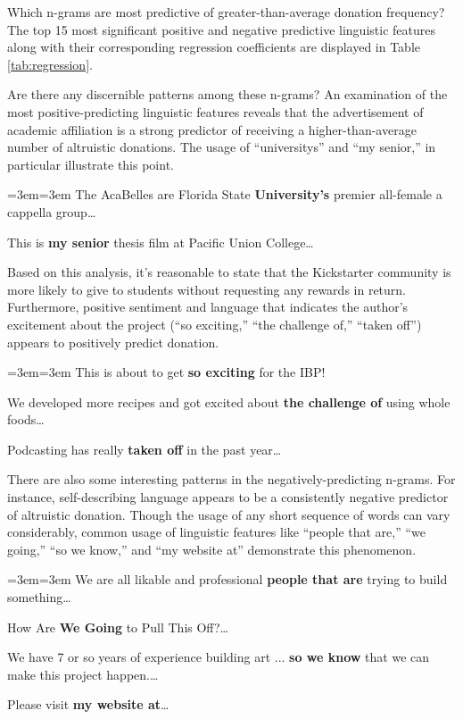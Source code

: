 \documentclass[letterpaper]{article}
\newenvironment{blockquote}{%
  \setlength{\parskip}{.5em}
  \par%
  \small
  \medskip
  \leftskip=3em\rightskip=3em%
  \noindent\ignorespaces}{%
  \par\medskip}
\begin{document}
Which n-grams are most predictive of greater-than-average donation frequency? The top 15 most significant positive and negative predictive linguistic features along with their corresponding regression coefficients are displayed in Table \ref{tab:regression}.

Are there any discernible patterns among these n-grams? An examination of the most positive-predicting linguistic features reveals that the advertisement of academic affiliation is a strong predictor of receiving a higher-than-average number of altruistic donations. The usage of ``universitys'' and ``my senior,'' in particular illustrate this point.
\begin{blockquote}
The AcaBelles are Florida State \textbf{University's} premier all-female a cappella group\ldots\par\noindent
This is \textbf{my senior} thesis film at Pacific Union College\ldots\par\noindent
\end{blockquote}
Based on this analysis, it's reasonable to state that the Kickstarter community is more likely to give to students without requesting any rewards in return.
Furthermore, positive sentiment and language that indicates the author's excitement about the project (``so exciting,'' ``the challenge of,'' ``taken off'') appears to positively predict donation.
\begin{blockquote}
This is about to get \textbf{so exciting} for the IBP! \par\noindent
We developed more recipes and got excited about \textbf{the challenge of} using whole foods\ldots\par\noindent
Podcasting has really \textbf{taken off} in the past year\ldots
\end{blockquote}
There are also some interesting patterns in the negatively-predicting n-grams. For instance, self-describing language appears to be a consistently negative predictor of altruistic donation. Though the usage of any short sequence of words can vary considerably, common usage of linguistic features like ``people that are,'' ``we going,'' ``so we know,'' and ``my website at'' demonstrate this phenomenon.
\begin{blockquote}
We are all likable and professional \textbf{people that are} trying to build something\ldots\par\noindent
How Are \textbf{We Going} to Pull This Off?\ldots\par\noindent
We have 7 or so years of experience building art ... \textbf{so we know} that we can make this project happen.\ldots\par\noindent
Please visit \textbf{my website at}\ldots
\end{blockquote}
\end{document}
